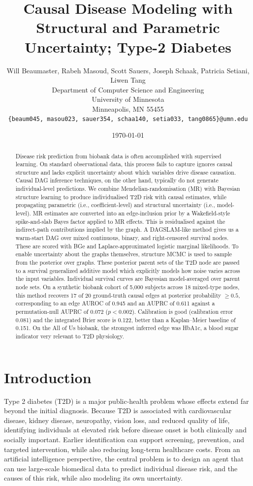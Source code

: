 \documentclass[11pt]{article}
\title{Causal Disease Modeling with Structural and Parametric Uncertainty; Type-2 Diabetes}
\author{
Will Beaumaster, Rabeh Masoud, Scott Sauers, Joseph Schaak, Patricia Setiani, Liwen Tang\\
Department of Computer Science and Engineering \\
University of Minnesota \\
Minneapolis, MN 55455 \\
\texttt{\{beaum045, masou023, sauer354, schaa140, setia033, tang0865\}@umn.edu}
}
\date{\today}
\begin{document}
\maketitle

\begin{abstract}
Disease risk prediction from biobank data is often accomplished with supervised learning. On standard observational data, this process fails to capture ignores causal structure and lacks explicit uncertainty about which variables drive disease causation. Causal DAG inference techniques, on the other hand, typically do not generate individual-level predictions. We combine Mendelian-randomisation (MR) with Bayesian structure learning to produce individualised T2D risk with causal estimates, while propagating parametric (i.e., coefficient-level) and structural uncertainty (i.e., model-level). MR estimates are converted into an edge-inclusion prior by a Wakefield-style spike-and-slab Bayes factor applied to MR effects. This is residualised against the indirect-path contributions implied by the graph. A DAGSLAM-like method gives us a warm-start DAG over mixed continuous, binary, and right-censored survival nodes. These are scored with BGe and Laplace-approximated logistic marginal likelihoods. To enable uncertainty about the graphs themselves, structure MCMC is used to sample from the posterior over graphs. These posterior parent sets of the T2D node are passed to a survival generalized additive model which explicitly models how noise varies across the input variables. Individual survival curves are Bayesian model-averaged over parent node sets. On a synthetic biobank cohort of 5{,}000 subjects across 18 mixed-type nodes, this method recovers 17 of 20 ground-truth causal edges at posterior probability $\ge 0.5$, corresponding to an edge AUROC of 0.945 and an AUPRC of 0.611 against a permutation-null AUPRC of 0.072 ($p<0.002$). Calibration is good (calibration error 0.081) and the integrated Brier score is 0.122, better than a Kaplan--Meier baseline of 0.151. On the All of Us biobank, the strongest inferred edge was HbA1c, a blood sugar indicator very relevant to T2D physiology.
\end{abstract}


\section{Introduction}

Type 2 diabetes (T2D) is a major public-health problem whose effects extend far beyond the initial diagnosis. Because T2D is associated with cardiovascular disease, kidney disease, neuropathy, vision loss, and reduced quality of life, identifying individuals at elevated risk before disease onset is both clinically and socially important. Earlier identification can support screening, prevention, and targeted intervention, while also reducing long-term healthcare costs. From an artificial intelligence perspective, the central problem is to design an agent that can use large-scale biomedical data to predict individual disease risk, and the causes of this risk, while also modeling its own uncertainty.
\end{document}

